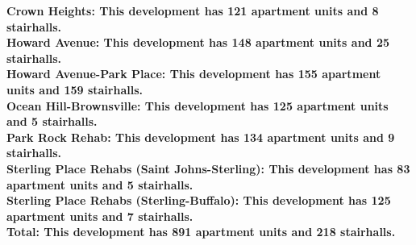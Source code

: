 \bf{Crown Heights}: This development has 121 apartment units and 8 stairhalls.\\\bf{Howard Avenue}: This development has 148 apartment units and 25 stairhalls.\\\bf{Howard Avenue-Park Place}: This development has 155 apartment units and 159 stairhalls.\\\bf{Ocean Hill-Brownsville}: This development has 125 apartment units and 5 stairhalls.\\\bf{Park Rock Rehab}: This development has 134 apartment units and 9 stairhalls.\\\bf{Sterling Place Rehabs (Saint Johns-Sterling)}: This development has 83 apartment units and 5 stairhalls.\\\bf{Sterling Place Rehabs (Sterling-Buffalo)}: This development has 125 apartment units and 7 stairhalls.\\\bf{Total}: This development has 891 apartment units and 218 stairhalls.\\